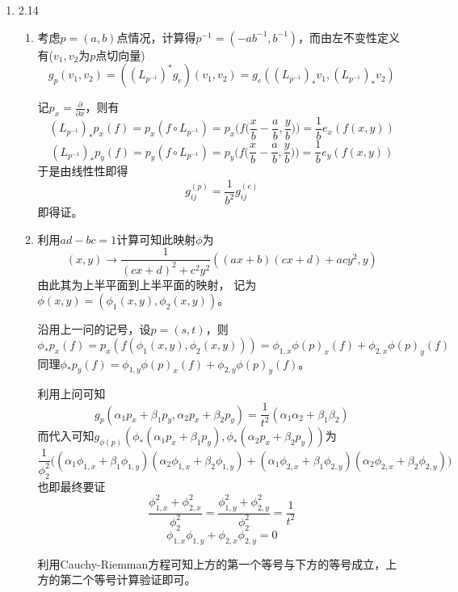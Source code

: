 \documentclass[a4paper,UTF8,fontset=windows,10pt]{ctexart}
\begin{document}
\begin{enumerate}
    \item 2.14
    \begin{enumerate}[(1)]
        \item 考虑$p=(a,b)$点情况，计算得$p^{-1}=(-ab^{-1},b^{-1})$，而由左不变性定义有($v_1,v_2$为$p$点切向量)
        $$g_p(v_1,v_2)=((L_{p^{-1}})^*g_e)(v_1,v_2)=g_e((L_{p^{-1}})_*v_1,(L_{p^{-1}})_*v_2)$$
    
        记$p_x=\frac{\partial}{\partial x}$，则有
        $$(L_{p^{-1}})_*p_x(f)=p_x(f\circ L_{p^{-1}})=p_x\bigg(f\bigg(\frac{x}{b}-\frac{a}{b},\frac{y}{b}\bigg)\bigg)=\frac{1}{b}e_x(f(x,y))$$
        $$(L_{p^{-1}})_*p_y(f)=p_y(f\circ L_{p^{-1}})=p_y\bigg(f\bigg(\frac{x}{b}-\frac{a}{b},\frac{y}{b}\bigg)\bigg)=\frac{1}{b}e_y(f(x,y))$$
        于是由线性性即得
        $$g_{ij}^{(p)}=\frac{1}{b^2}g_{ij}^{(e)}$$
        即得证。
        
        \item 利用$ad-bc=1$计算可知此映射$\phi$为
        $$(x,y)\to\frac{1}{(cx+d)^2+c^2y^2}((ax+b)(cx+d)+acy^2,y)$$
        由此其为上半平面到上半平面的映射， 记为$\phi(x,y)=(\phi_1(x,y),\phi_2(x,y))$。
    
        沿用上一问的记号，设$p=(s,t)$，则
        $$\phi_*p_x(f)=p_x(f(\phi_1(x,y),\phi_2(x,y)))=\phi_{1,x}\phi(p)_x(f)+\phi_{2,x}\phi(p)_y(f)$$
        同理$\phi_*p_y(f)=\phi_{1,y}\phi(p)_x(f)+\phi_{2,y}\phi(p)_y(f)$。
        
        利用上问可知
        $$g_p(\alpha_1p_x+\beta_1p_y,\alpha_2p_x+\beta_2p_y)=\frac{1}{t^2}(\alpha_1\alpha_2+\beta_1\beta_2)$$
        而代入可知$g_{\phi(p)}(\phi_*(\alpha_1p_x+\beta_1p_y),\phi_*(\alpha_2p_x+\beta_2p_y))$为
        $$\frac{1}{\phi_2^2}\big((\alpha_1\phi_{1,x}+\beta_1\phi_{1,y})(\alpha_2\phi_{1,x}+\beta_2\phi_{1,y})+(\alpha_1\phi_{2,x}+\beta_1\phi_{2,y})(\alpha_2\phi_{2,x}+\beta_2\phi_{2,y})\big)$$
        也即最终要证
        $$\frac{\phi_{1,x}^2+\phi_{2,x}^2}{\phi_2^2}=\frac{\phi_{1,y}^2+\phi_{2,y}^2}{\phi_2^2}=\frac{1}{t^2}$$
        $$\phi_{1,x}\phi_{1,y}+\phi_{2,x}\phi_{2,y}=0$$
        
        利用Cauchy-Riemman方程可知上方的第一个等号与下方的等号成立，上方的第二个等号计算验证即可。
    \end{enumerate}
\end{enumerate}
\end{document}

